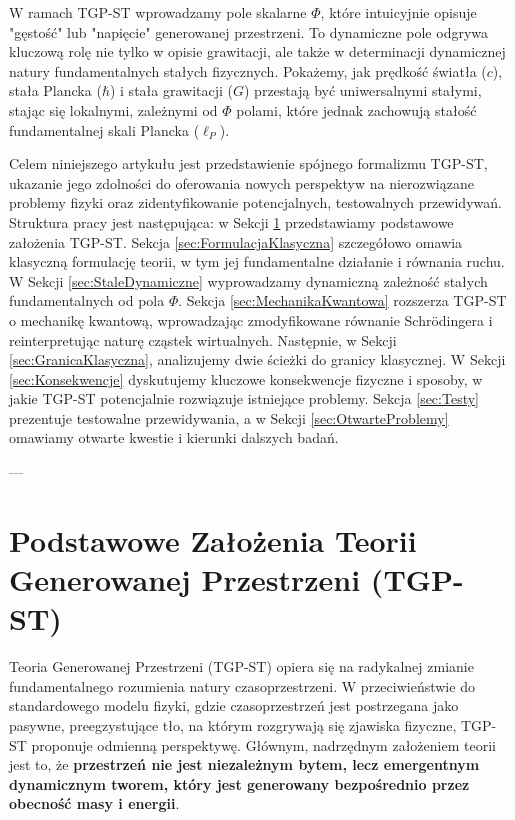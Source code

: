 \documentclass[11pt,a4paper]{article}
\begin{document}
W ramach TGP-ST wprowadzamy pole skalarne $\Phi$, które intuicyjnie opisuje "gęstość" lub "napięcie" generowanej przestrzeni. To dynamiczne pole odgrywa kluczową rolę nie tylko w opisie grawitacji, ale także w determinacji dynamicznej natury fundamentalnych stałych fizycznych. Pokażemy, jak prędkość światła ($c$), stała Plancka ($\hbar$) i stała grawitacji ($G$) przestają być uniwersalnymi stałymi, stając się lokalnymi, zależnymi od $\Phi$ polami, które jednak zachowują stałość fundamentalnej skali Plancka ($\ell_P$).

Celem niniejszego artykułu jest przedstawienie spójnego formalizmu TGP-ST, ukazanie jego zdolności do oferowania nowych perspektyw na nierozwiązane problemy fizyki oraz zidentyfikowanie potencjalnych, testowalnych przewidywań. Struktura pracy jest następująca: w Sekcji \ref{sec:Zalozenia} przedstawiamy podstawowe założenia TGP-ST. Sekcja \ref{sec:FormulacjaKlasyczna} szczegółowo omawia klasyczną formulację teorii, w tym jej fundamentalne działanie i równania ruchu. W Sekcji \ref{sec:StaleDynamiczne} wyprowadzamy dynamiczną zależność stałych fundamentalnych od pola $\Phi$. Sekcja \ref{sec:MechanikaKwantowa} rozszerza TGP-ST o mechanikę kwantową, wprowadzając zmodyfikowane równanie Schrödingera i reinterpretując naturę cząstek wirtualnych. Następnie, w Sekcji \ref{sec:GranicaKlasyczna}, analizujemy dwie ścieżki do granicy klasycznej. W Sekcji \ref{sec:Konsekwencje} dyskutujemy kluczowe konsekwencje fizyczne i sposoby, w jakie TGP-ST potencjalnie rozwiązuje istniejące problemy. Sekcja \ref{sec:Testy} prezentuje testowalne przewidywania, a w Sekcji \ref{sec:OtwarteProblemy} omawiamy otwarte kwestie i kierunki dalszych badań.

---

\section{Podstawowe Założenia Teorii Generowanej Przestrzeni (TGP-ST)}
\label{sec:Zalozenia}

Teoria Generowanej Przestrzeni (TGP-ST) opiera się na radykalnej zmianie fundamentalnego rozumienia natury czasoprzestrzeni. W przeciwieństwie do standardowego modelu fizyki, gdzie czasoprzestrzeń jest postrzegana jako pasywne, preegzystujące tło, na którym rozgrywają się zjawiska fizyczne, TGP-ST proponuje odmienną perspektywę. Głównym, nadrzędnym założeniem teorii jest to, że \textbf{przestrzeń nie jest niezależnym bytem, lecz emergentnym dynamicznym tworem, który jest generowany bezpośrednio przez obecność masy i energii}.
\end{document}
